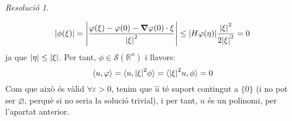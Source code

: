 \documentclass[10pt,a4paper]{article}
\newcommand{\RR}{\ensuremath{\mathbb{R}}} %
\theoremstyle{definition}
\theoremstyle{remark}
\newtheorem*{res}{Resolució}
\begin{document}
\begin{res}
\begin{enumerate}
          $$\abs{\phi(\xi)} = \abs{\frac{\varphi(\xi)-\varphi(0)-\grad \varphi(0)\cdot \xi}{\abs{\xi}^2}}\leq \abs{H\varphi(\eta)}\frac{\abs{\xi}^2}{2\abs{\xi}^2} =0$$
          ja que $\abs{\eta} \leq\abs{\xi}$. Per tant, $\phi\in\mathcal{S}(\RR^n)$ i llavors:
          $$
            \langle  u,\varphi\rangle = \langle u,\abs{\xi}^2\phi\rangle = \langle \abs{\xi}^2u,\phi\rangle = 0
          $$
          Com que això és vàlid $\forall \varepsilon>0$, tenim que $\widehat{u}$ té suport contingut a $\{0\}$ (i no pot ser $\varnothing$, perquè si no seria la solució trivial), i per tant, $u$ és un polinomi, per l'apartat anterior.
  \end{enumerate}
\end{res}
\end{document}
